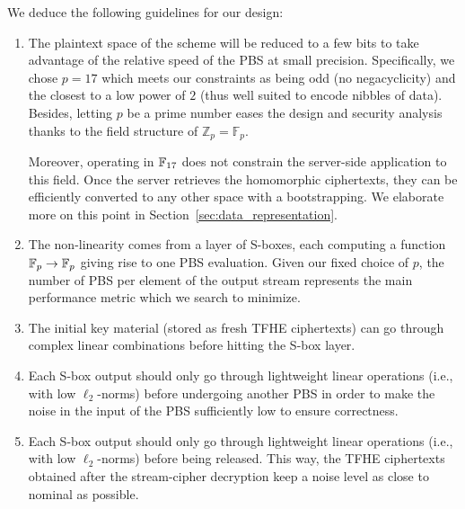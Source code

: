 We deduce the following guidelines for our design:
\begin{enumerate}
\item The plaintext space of the scheme will be reduced to a few bits to take advantage of the relative speed of the PBS at small precision. Specifically, we chose $p=17$ which meets our constraints as being odd (no negacyclicity) and the closest to a low power of $2$ (thus well suited to encode nibbles of data). Besides, letting $p$ be a prime number eases the design and security analysis thanks to the field structure of $\mathbb{Z}_p = \mathbb{F}_p$.
  
Moreover, operating in $\mathbb{F}_{17}$ does not constrain the server-side application to this field. Once the server retrieves the homomorphic ciphertexts, they can be efficiently converted to any other space with a bootstrapping. We elaborate more on this point in Section~\ref{sec:data_representation}. 


  \item The non-linearity comes from a layer of S-boxes, each computing a function $\mathbb{F}_{p} \to \mathbb{F}_{p}$  giving rise to one PBS evaluation. Given our fixed choice of $p$, the number of PBS per element of the output stream represents the main performance metric which we search to minimize. 

  
  \item The initial key material (stored as fresh TFHE ciphertexts) can go through complex linear combinations
  before hitting the S-box layer.
  
  \item Each S-box output should only go through lightweight linear operations (i.e., with low $\ell_2$-norms) before undergoing another PBS in order to make the noise in the input of the PBS sufficiently low to ensure correctness.

  
  \item Each S-box output should only go through lightweight linear operations (i.e., with low $\ell_2$-norms) before being
  released. This way, the TFHE ciphertexts obtained after the stream-cipher decryption keep a noise level as close to nominal as possible.
\end{enumerate}


